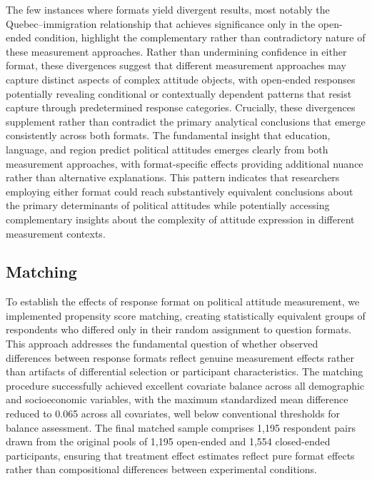 \documentclass[
  journal=ram,
  manuscript=article-type,
  year=2025,
  volume=unpublished,
]{cup-journal}
\begin{document}
The few instances where formats yield divergent results, most notably the Quebec–immigration relationship that achieves significance only in the open-ended condition, highlight the complementary rather than contradictory nature of these measurement approaches.
Rather than undermining confidence in either format, these divergences suggest that different measurement approaches may capture distinct aspects of complex attitude objects, with open-ended responses potentially revealing conditional or contextually dependent patterns that resist capture through predetermined response categories.
Crucially, these divergences supplement rather than contradict the primary analytical conclusions that emerge consistently across both formats.
The fundamental insight that education, language, and region predict political attitudes emerges clearly from both measurement approaches, with format-specific effects providing additional nuance rather than alternative explanations.
This pattern indicates that researchers employing either format could reach substantively equivalent conclusions about the primary determinants of political attitudes while potentially accessing complementary insights about the complexity of attitude expression in different measurement contexts.

\subsection{Matching}

To establish the effects of response format on political attitude measurement, we implemented propensity score matching, creating statistically equivalent groups of respondents who differed only in their random assignment to question formats.
This approach addresses the fundamental question of whether observed differences between response formats reflect genuine measurement effects rather than artifacts of differential selection or participant characteristics.
The matching procedure successfully achieved excellent covariate balance across all demographic and socioeconomic variables, with the maximum standardized mean difference reduced to 0.065 across all covariates, well below conventional thresholds for balance assessment.
The final matched sample comprises 1,195 respondent pairs drawn from the original pools of 1,195 open-ended and 1,554 closed-ended participants, ensuring that treatment effect estimates reflect pure format effects rather than compositional differences between experimental conditions.
\end{document}
